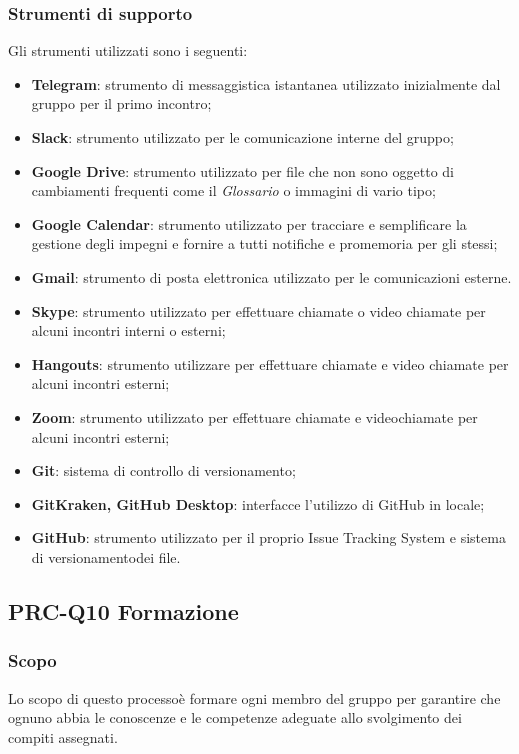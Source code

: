 			\subsubsection{Strumenti di supporto}
				Gli strumenti utilizzati sono i seguenti:
				\begin{itemize}
					\item \textbf{Telegram}: strumento di messaggistica istantanea utilizzato inizialmente dal gruppo per il primo incontro;
					\item \textbf{Slack}: strumento utilizzato per le comunicazione interne del gruppo;
					\item \textbf{Google Drive}: strumento utilizzato per file che non sono oggetto di cambiamenti frequenti come il \textit{Glossario} o immagini di vario tipo;
					\item \textbf{Google Calendar}: strumento utilizzato per tracciare e semplificare la gestione degli impegni e fornire a tutti notifiche e promemoria per gli stessi;
					\item \textbf{Gmail}: strumento di posta elettronica utilizzato per le comunicazioni esterne.
					\item \textbf{Skype}: strumento utilizzato per effettuare chiamate o video chiamate per alcuni incontri interni o esterni;
					\item \textbf{Hangouts}: strumento utilizzare per effettuare chiamate e video chiamate per alcuni incontri esterni;
					\item \textbf{Zoom}: strumento utilizzato per effettuare chiamate e videochiamate per alcuni incontri esterni; 
					\item \textbf{Git}: sistema di controllo di versionamento\glo;
					\item \textbf{GitKraken, GitHub Desktop}: interfacce l'utilizzo di GitHub in locale;
					\item \textbf{GitHub}: strumento utilizzato per il proprio Issue Tracking System e sistema di versionamento\glosp dei file.
				\end{itemize}
	\subsection{PRC-Q10 Formazione}
		\subsubsection{Scopo}
			Lo scopo di questo processo\glosp è formare ogni membro del gruppo per garantire che ognuno abbia le conoscenze e le competenze adeguate allo svolgimento dei compiti assegnati.
